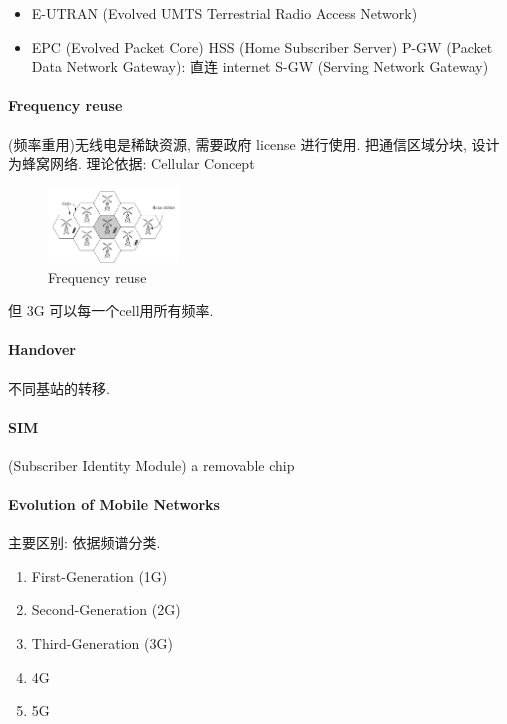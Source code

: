 \begin{itemize}\small
    \item E-UTRAN (Evolved UMTS Terrestrial Radio Access Network)
    \item EPC (Evolved Packet Core)
    \subitem HSS (Home Subscriber Server)
    \subitem P-GW (Packet Data Network Gateway): 直连 internet
    \subitem S-GW (Serving Network Gateway)
\end{itemize}

\paragraph{Frequency reuse} (频率重用)无线电是稀缺资源, 需要政府 license 进行使用. 把通信区域分块, 设计为蜂窝网络. 理论依据: Cellular Concept %

\begin{figure}[!htb]
    \centering
    \includegraphics[width=0.309\textwidth]{pic/CN1/frequency reuse}
    \caption{Frequency reuse}
\end{figure}

但 3G 可以每一个cell用所有频率. 

\paragraph{Handover} 不同基站的转移. 

\paragraph{SIM} (Subscriber Identity Module) a removable chip

\paragraph{Evolution of Mobile Networks} 主要区别: 依据频谱分类. 
\begin{enumerate}
    \item First-Generation (1G) 
    \item Second-Generation (2G)
    \item Third-Generation (3G)
    \item 4G
    \item 5G
\end{enumerate}

